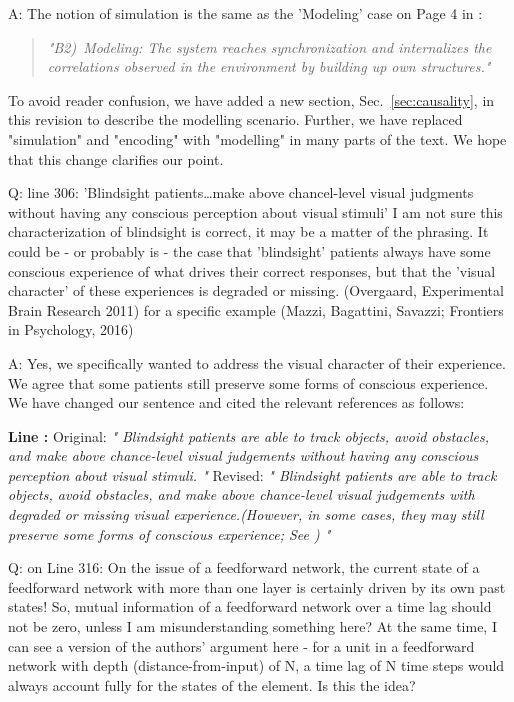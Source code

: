\documentclass[utf8]{article}
\newcounter{cQuestion}[section]
\newenvironment{question}
    {\refstepcounter{cQuestion}\color{Blue}\noindent\newline Q\thecQuestion:}
    {~\newline}
\newenvironment{ans}  
    {\color{Black}\noindent A:}
    {~\newline}
\newcommand{\revise}[3]{
	\newline
	\newline
    \noindent
    \textbf{Line #1:}
    \newline
    Original:\newline
    \textit{"#2"}
    \newline
    \newline
    Revised:\newline
    \textit{"#3"}\newline}
\begin{document}
    	\begin{ans}
    		The notion of simulation is the same as the 'Modeling' case on Page 4 in \cite{BERTSCHINGER.2006}: 
    		\begin{quote}
		    	\textit{"B2)~Modeling: The system reaches synchronization and internalizes the correlations observed in the environment by building up own structures."}
    		\end{quote}
    	    
    	    To avoid reader confusion, we have added a new section, Sec.~\ref{sec:causality}, in this revision to describe the modelling scenario. Further, we have replaced "simulation" and "encoding" with "modelling" in many parts of the text. We hope that this change clarifies our point.
    	\end{ans}
    
   	\begin{question}
			line 306: 'Blindsight patients\dots make above chancel-level visual judgments without having any conscious perception about visual stimuli' I am not sure this characterization of blindsight is correct, it may be a matter of the phrasing. It could be - or probably is - the case that 'blindsight' patients always have some conscious experience of what drives their correct responses, but that the 'visual character' of these experiences is degraded or missing.
			(Overgaard, Experimental Brain Research 2011)
			for a specific example
			(Mazzi, Bagattini, Savazzi; Frontiers in Psychology, 2016)
    	\end{question}
    
    
   		\begin{ans}
   			Yes, we specifically wanted to address the visual character of their experience. We agree that some patients still preserve some forms of conscious experience. 
   			We have changed our sentence and cited the relevant references as follows:
   			\revise{}
   			{
   				Blindsight patients are able to track objects, avoid obstacles, and make above chance-level visual judgements without having any conscious perception about visual stimuli.
   			}
   			{
   				Blindsight patients are able to track objects, avoid obstacles, and make above chance-level visual judgements with degraded or missing visual experience.(However, in some cases, they may still preserve some forms of conscious experience; See \cite{overgaard2011visual, mazzi2016blind}) 
   			}
   		\end{ans}

    
    	\begin{question}
            on Line 316: On the issue of a feedforward network, the current state of a feedforward network with more than one layer is certainly driven by its own past states! So, mutual information of a feedforward network over a time lag should not be zero, unless I am misunderstanding something here?
			At the same time, I can see a version of the authors' argument here - for a unit in a feedforward network with depth (distance-from-input) of N, a time lag of N time steps would always account fully for the states of the element. Is this the idea?		
    	\end{question}
    
\end{document}
